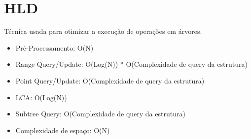 \documentclass[11pt, a4paper, oneside]{book}
\begin{document}
\hfill

\section{HLD}


Técnica usada para otimizar a execução de operações em árvores.



\begin{itemize}
\item Pré-Processamento: O(N)
\item Range Query/Update: O(Log(N)) * O(Complexidade de query da estrutura)
\item Point Query/Update: O(Complexidade de query da estrutura)
\item LCA: O(Log(N))
\item Subtree Query: O(Complexidade de query da estrutura)
\item Complexidade de espaço: O(N)
\end{itemize}



\hfill
\end{document}
